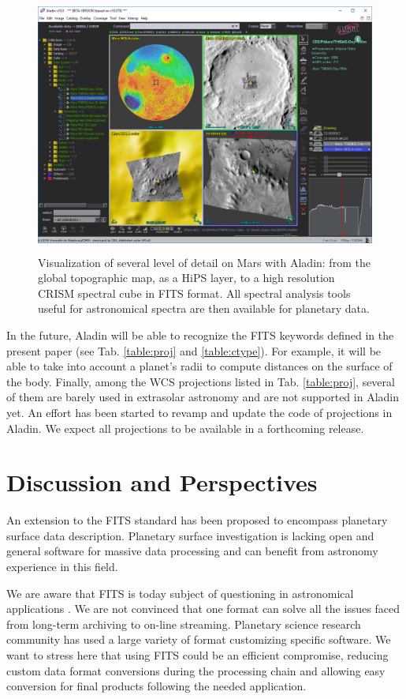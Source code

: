 \begin{figure}[ht!]
\centerline{\includegraphics[height=20pc]{ess_marmo6}}
\caption{Visualization of several level of detail on Mars with Aladin: from the
global topographic map, as a HiPS layer, to a high resolution CRISM spectral cube
in FITS format. All spectral analysis tools useful for astronomical spectra
are then available for planetary data.}
\label{fig:aladin}
\end{figure}

In the future, Aladin will be able to recognize the FITS keywords defined
in the present paper (see Tab. \ref{table:proj} and \ref{table:ctype}).
For example, it will be able to take into account a planet's radii to compute
distances on the surface of the body.
Finally, among the WCS projections listed in Tab. \ref{table:proj}, several of
them are barely used in extrasolar astronomy and are not supported in Aladin yet.
An effort has been started to revamp and update the code of projections in
Aladin.
We expect all projections to be available in a forthcoming release.

\section{Discussion and Perspectives}
\label{sec:disc}
An extension to the FITS standard has been proposed to encompass planetary
surface data description.
Planetary surface investigation is lacking open and general software for massive data
processing and can benefit from astronomy experience in this field.

We are aware that FITS is today subject of questioning in astronomical applications
\citep{THOMAS2015133}.
We are not convinced that one format can solve all the issues faced from long-term
archiving to on-line streaming.
Planetary science research community has used a large variety of format customizing
specific software.
We want to stress here that using FITS could be an efficient compromise, reducing custom
data format conversions during the processing chain and
allowing easy conversion for final products following the needed application.

